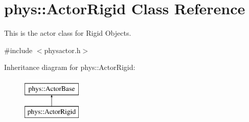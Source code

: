 \hypertarget{classphys_1_1ActorRigid}{
\section{phys::ActorRigid Class Reference}
\label{d8/d71/classphys_1_1ActorRigid}
}


This is the actor class for Rigid Objects.  




{\ttfamily \#include $<$physactor.h$>$}

Inheritance diagram for phys::ActorRigid:\begin{figure}[H]
\begin{center}
\leavevmode
\includegraphics[height=2cm]{d8/d71/classphys_1_1ActorRigid}
\end{center}
\end{figure}

